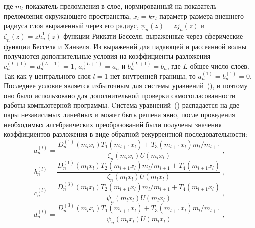 где $m_l$ показатель преломления в слое, нормированный на показатель
преломления окружающего пространства, $x_l=kr_l$ параметр размера
внешнего радиуса слоя выраженный через его радиус,
$\psi_{n}(z) = z j_n(z)$ и $\zeta_{n}(z) = z h_n^1(z)$ функции
Риккати-Бесселя, выраженные через сферические функции Бесселя и
Ханкеля.  Из выражений для падающей и рассеянной волны получаются
дополнительные условия на коэффициенты разложения
$c_n^{(L+1)}=d_n^{(L+1)}=1$, $a_n^{(L+1)}=a_n$ и $b_n^{(L+1)}=b_n$,
где $L$ общее число слоёв. Так как у центрального слоя $l=1$ нет
внутренней границы, то $a_n^{(1)}=b_n^{(1)}=0$. Последнее условие
является избыточным для системы
уравнений~(), и поэтому оно
было использовано для дополнительной проверки самосогласованности
работы компьютерной программы.  Cистема
уравнений~() распадается на
две пары независимых линейных и может быть решена явно, после
проведения необходимых алгебраических преобразований были получены
значения коэффициентов разложения в виде обратной рекуррентной
последовательности:
\begin{equation}
\label{eq:6p1}
a^{(l)}_n = \frac
{
    {D^{(1)}_{n}}{\left (m_{l} x_{l} \right )}
    T_1\left (m_{l+1} x_{l} \right )
    +
    T_3\left (m_{l+1} x_{l} \right )
    m_{l}/m_{l+1}
}
{
   \zeta_{n}\left (m_{l} x_{l} \right )
   U\left (m_{l} x_{l} \right )
}\:,
\end{equation}
\begin{equation}
\label{eq:6p2}
b^{(l)}_n = \frac
{
    {D^{(1)}_{n}}{\left (m_{l} x_{l} \right )}
    T_2\left (m_{l+1} x_{l} \right )
    m_{l}/m_{l+1}
    +
    T_4\left (m_{l+1} x_{l} \right )
}
{
   \zeta_{n}\left (m_{l} x_{l} \right )
   U\left (m_{l} x_{l} \right )
}\:,
\end{equation}
\begin{equation}
\label{eq:6p3}
c^{(l)}_n = \frac
{
    {D^{(3)}_{n}}{\left (m_{l} x_{l} \right )}
    T_2\left (m_{l+1} x_{l} \right )
    m_{l}/m_{l+1}
    +
    T_4\left (m_{l+1} x_{l} \right )
}
{
   \psi_{n}\left (m_{l} x_{l} \right )
   U\left (m_{l} x_{l} \right )
}\:,
\end{equation}
\begin{equation}
\label{eq:6p4}
d^{(l)}_n = \frac
{
    {D^{(3)}_{n}}{\left (m_{l} x_{l} \right )}
    T_1\left (m_{l+1} x_{l} \right )
    +
    T_3\left (m_{l+1} x_{l} \right )
    m_{l}/m_{l+1}
}
{
   \psi_{n}\left (m_{l} x_{l} \right )
   U\left (m_{l} x_{l} \right )
}\:,
\end{equation}
